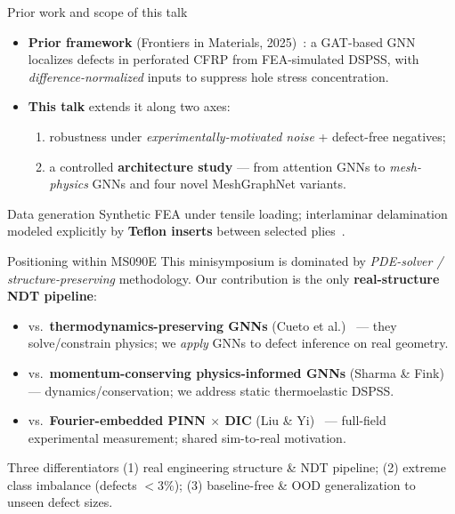 \documentclass[aspectratio=169,10pt]{beamer}
\begin{document}
\begin{frame}{Prior work and scope of this talk}
\begin{itemize}
  \item \textbf{Prior framework} (Frontiers in Materials, 2025)~\cite{nishioka2025development}:
        a GAT-based GNN localizes defects in perforated CFRP from FEA-simulated DSPSS,
        with \emph{difference-normalized} inputs to suppress hole stress concentration.
  \item \textbf{This talk} extends it along two axes:
  \begin{enumerate}
    \item robustness under \emph{experimentally-motivated noise} + defect-free negatives;
    \item a controlled \textbf{architecture study} — from attention GNNs to
          \emph{mesh-physics} GNNs and four novel MeshGraphNet variants.
  \end{enumerate}
\end{itemize}
\vspace{0.4em}
\begin{block}{Data generation}
Synthetic FEA under tensile loading; interlaminar delamination modeled
explicitly by \textbf{Teflon inserts} between selected plies~\cite{nishioka2025development}.
\end{block}
\end{frame}

\begin{frame}{Positioning within MS090E}
This minisymposium is dominated by \emph{PDE-solver / structure-preserving}
methodology. Our contribution is the only \textbf{real-structure NDT pipeline}:
\begin{itemize}
  \item vs.\ \textbf{thermodynamics-preserving GNNs} (Cueto et al.)~\cite{hernandez2022thermodynamics,hernandez2021structure}
        — they solve/constrain physics; we \emph{apply} GNNs to defect inference on real geometry.
  \item vs.\ \textbf{momentum-conserving physics-informed GNNs} (Sharma \& Fink)
        — dynamics/conservation; we address static thermoelastic DSPSS.
  \item vs.\ \textbf{Fourier-embedded PINN $\times$ DIC} (Liu \& Yi)~\cite{tancik2020fourier}
        — full-field experimental measurement; shared sim-to-real motivation.
\end{itemize}
\vspace{0.3em}
\begin{alertblock}{Three differentiators}
(1) real engineering structure \& NDT pipeline; \;
(2) extreme class imbalance (defects $<3\%$); \;
(3) baseline-free \& OOD generalization to unseen defect sizes.
\end{alertblock}
\end{frame}
\end{document}

